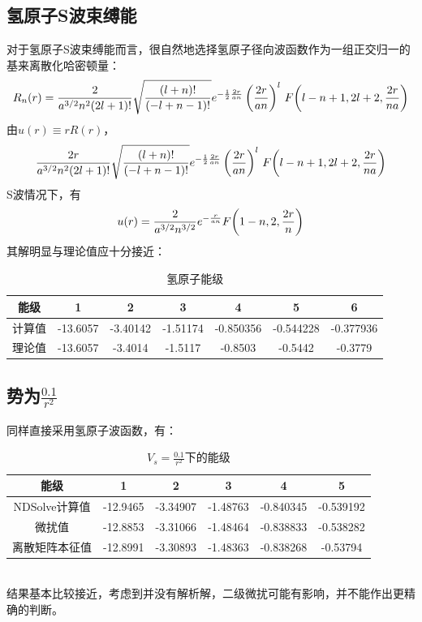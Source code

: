 \documentclass[hyperref]{ctexart}
\begin{document}
\subsection{氢原子S波束缚能}
对于氢原子S波束缚能而言，很自然地选择氢原子径向波函数作为一组正交归一的基来离散化哈密顿量：
\begin{equation}
R_n(r)=\frac{2}{a^{3/2} n^2 (2 l+1)!} \sqrt{\frac{(l+n)!}{(-l+n-1)!}} e^{-\frac{1}{2}\frac{2 r}{a n}} \left(\frac{2 r}{a n}\right)^l \,F\pqty{l-n+1,2 l+2,\frac{2 r}{n a}}
\end{equation}
由$u(r)\equiv rR(r)$，
\begin{equation}\label{ur}
  \frac{2r}{a^{3/2} n^2 (2 l+1)!} \sqrt{\frac{(l+n)!}{(-l+n-1)!}} e^{-\frac{1}{2}\frac{2 r}{a n}} \left(\frac{2 r}{a n}\right)^l \,F\pqty{l-n+1,2 l+2,\frac{2 r}{n a}}
\end{equation}
S波情况下，有
\begin{equation}\label{us}
  u(r)=\frac{2 }{a^{3/2} n^{3/2}}e^{-\frac{r}{a n}}F\pqty{1-n,2,\frac{2 r}{n}}
\end{equation}
其解明显与理论值应十分接近：
\begin{table}[!htdp]
  \centering
  \begin{tabular}{|c|c|c|c|c|c|c|}
    \hline
    能级 & 1 & 2 & 3 & 4 & 5 & 6 \\
    \hline
    计算值 & -13.6057 & -3.40142 & -1.51174 & -0.850356 & -0.544228 & -0.377936\\
    \hline
    理论值 & -13.6057 & -3.4014 & -1.5117 & -0.8503 & -0.5442 & -0.3779 \\
    \hline
  \end{tabular}
  \caption{氢原子能级}
\end{table}
\clearpage
\subsection{势为$\displaystyle\frac{0.1}{r^2}$}
同样直接采用氢原子波函数，有：
\begin{table}[!htbp]
  \centering
  \begin{tabular}{|c|c|c|c|c|c|}
    \hline
    能级 & 1 & 2 & 3 & 4 & 5 \\
    \hline
    NDSolve计算值 & -12.9465 & -3.34907 & -1.48763 & -0.840345 & -0.539192 \\
    \hline
    微扰值 & -12.8853 & -3.31066 & -1.48464 & -0.838833 & -0.538282 \\
    \hline
    离散矩阵本征值 & -12.8991 & -3.30893 & -1.48363 & -0.838268 & -0.53794 \\
    \hline
  \end{tabular}
  \caption{$\displaystyle V_s=\frac{0.1}{r^2}$下的能级}
\end{table}\\
结果基本比较接近，考虑到并没有解析解，二级微扰可能有影响，并不能作出更精确的判断。
\end{document}
